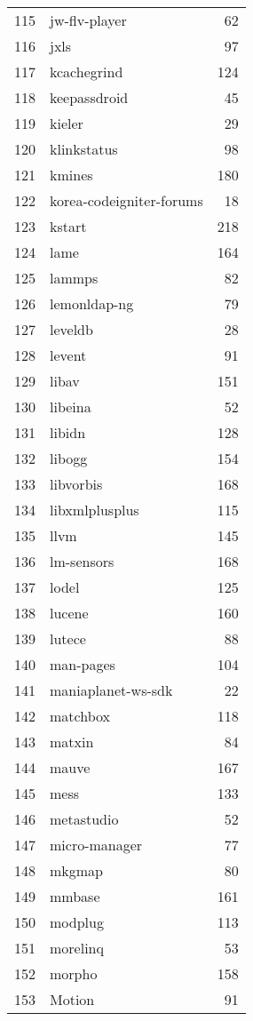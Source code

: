 \begin{table}[ht]
\begin{tabular}{rlr}
  115 & jw-flv-player &  62 \\ 
  116 & jxls &  97 \\ 
  117 & kcachegrind & 124 \\ 
  118 & keepassdroid &  45 \\ 
  119 & kieler &  29 \\ 
  120 & klinkstatus &  98 \\ 
  121 & kmines & 180 \\ 
  122 & korea-codeigniter-forums &  18 \\ 
  123 & kstart & 218 \\ 
  124 & lame & 164 \\ 
  125 & lammps &  82 \\ 
  126 & lemonldap-ng &  79 \\ 
  127 & leveldb &  28 \\ 
  128 & levent &  91 \\ 
  129 & libav & 151 \\ 
  130 & libeina &  52 \\ 
  131 & libidn & 128 \\ 
  132 & libogg & 154 \\ 
  133 & libvorbis & 168 \\ 
  134 & libxmlplusplus & 115 \\ 
  135 & llvm & 145 \\ 
  136 & lm-sensors & 168 \\ 
  137 & lodel & 125 \\ 
  138 & lucene & 160 \\ 
  139 & lutece &  88 \\ 
  140 & man-pages & 104 \\ 
  141 & maniaplanet-ws-sdk &  22 \\ 
  142 & matchbox & 118 \\ 
  143 & matxin &  84 \\ 
  144 & mauve & 167 \\ 
  145 & mess & 133 \\ 
  146 & metastudio &  52 \\ 
  147 & micro-manager &  77 \\ 
  148 & mkgmap &  80 \\ 
  149 & mmbase & 161 \\ 
  150 & modplug & 113 \\ 
  151 & morelinq &  53 \\ 
  152 & morpho & 158 \\ 
  153 & Motion &  91 \\ 

\end{tabular}
\end{table}

